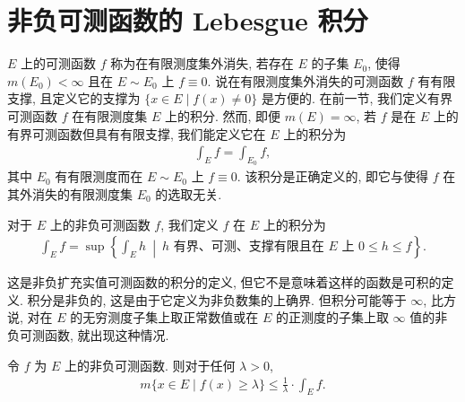 \documentclass[../../main.tex]{subfiles}
\begin{document}
\section{非负可测函数的 Lebesgue 积分}\label{section:ch04-非负可测积分}

$E$ 上的可测函数 $f$ 称为在有限测度集外消失, 若存在 $E$ 的子集 $E_{0}$, 使得 $m(E_{0})<\infty$ 且在 $E\sim E_{0}$ 上 $f\equiv 0$. 说在有限测度集外消失的可测函数 $f$ 有有限支撑, 且定义它的支撑为 $\{x\in E\mid f(x)\neq 0\}$ 是方便的. 在前一节, 我们定义有界可测函数 $f$ 在有限测度集 $E$ 上的积分. 然而, 即便 $m(E)=\infty$, 若 $f$ 是在 $E$ 上的有界可测函数但具有有限支撑, 我们能定义它在 $E$ 上的积分为
\begin{align*}
\int_{E}f=\int_{E_{0}}f,
\end{align*}
其中 $E_{0}$ 有有限测度而在 $E\sim E_{0}$ 上 $f\equiv 0$. 该积分是正确定义的, 即它与使得 $f$ 在其外消失的有限测度集 $E_{0}$ 的选取无关.

\begin{definition}[非负可测函数的积分]\label{definition:ch04-非负积分}
对于 $E$ 上的非负可测函数 $f$, 我们定义 $f$ 在 $E$ 上的积分为
\begin{align}
\int_{E}f=\sup\left\{\int_{E}h\ \middle|\ h\text{ 有界、可测、支撑有限且在 }E\text{ 上 }0\leqslant h\leqslant f\right\}.\label{align:ch04-非负积分定义}
\end{align}
\end{definition}

这是非负扩充实值可测函数的积分的定义, 但它不是意味着这样的函数是可积的定义. 积分是非负的, 这是由于它定义为非负数集的上确界. 但积分可能等于 $\infty$, 比方说, 对在 $E$ 的无穷测度子集上取正常数值或在 $E$ 的正测度的子集上取 $\infty$ 值的非负可测函数, 就出现这种情况.

\begin{proposition}\label{proposition:ch04-Chebyshev}
令 $f$ 为 $E$ 上的非负可测函数. 则对于任何 $\lambda>0$,
\begin{align}
m\{x\in E\mid f(x)\geqslant\lambda\}\leqslant\frac{1}{\lambda}\cdot\int_{E}f.\label{align:ch04-Chebyshev}
\end{align}
\end{proposition}
\end{document}
